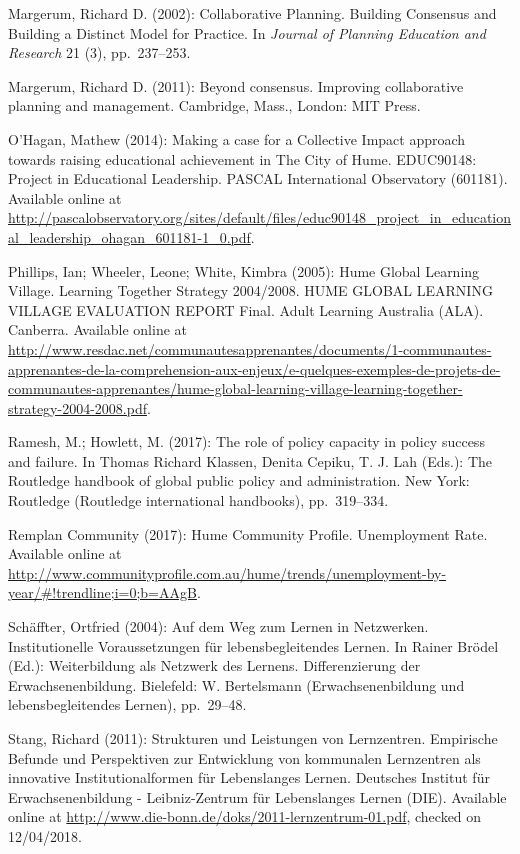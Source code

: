 \documentclass[a4paper,
fontsize=11pt,
oneside,
numbers=noperiodatend,
parskip=half-,
bibliography=totoc,
final
]{scrartcl}
\begin{document}
Margerum, Richard D. (2002): Collaborative Planning. Building Consensus
and Building a Distinct Model for Practice. In \emph{Journal of Planning
Education and Research} 21 (3), pp.~237--253.

Margerum, Richard D. (2011): Beyond consensus. Improving collaborative
planning and management. Cambridge, Mass., London: MIT Press.

O'Hagan, Mathew (2014): Making a case for a Collective Impact approach
towards raising educational achievement in The City of Hume. EDUC90148:
Project in Educational Leadership. PASCAL International Observatory
(601181). Available online at
\url{http://pascalobservatory.org/sites/default/files/educ90148_project_in_educational_leadership_ohagan_601181-1_0.pdf}.

Phillips, Ian; Wheeler, Leone; White, Kimbra (2005): Hume Global
Learning Village. Learning Together Strategy 2004/2008. HUME GLOBAL
LEARNING VILLAGE EVALUATION REPORT Final. Adult Learning Australia
(ALA). Canberra. Available online at
\url{http://www.resdac.net/communautesapprenantes/documents/1-communautes-apprenantes-de-la-comprehension-aux-enjeux/e-quelques-exemples-de-projets-de-communautes-apprenantes/hume-global-learning-village-learning-together-strategy-2004-2008.pdf}.

Ramesh, M.; Howlett, M. (2017): The role of policy capacity in policy
success and failure. In Thomas Richard Klassen, Denita Cepiku, T. J. Lah
(Eds.): The Routledge handbook of global public policy and
administration. New York: Routledge (Routledge international handbooks),
pp.~319--334.

Remplan Community (2017): Hume Community Profile. Unemployment Rate.
Available online at
\url{http://www.communityprofile.com.au/hume/trends/unemployment-by-year/\#!trendline;i=0;b=AAgB}.

Schäffter, Ortfried (2004): Auf dem Weg zum Lernen in Netzwerken.
Institutionelle Voraussetzungen für lebensbegleitendes Lernen. In Rainer
Brödel (Ed.): Weiterbildung als Netzwerk des Lernens. Differenzierung
der Erwachsenenbildung. Bielefeld: W. Bertelsmann (Erwachsenenbildung
und lebensbegleitendes Lernen), pp.~29--48.

Stang, Richard (2011): Strukturen und Leistungen von Lernzentren.
Empirische Befunde und Perspektiven zur Entwicklung von kommunalen
Lernzentren als innovative Institutionalformen für Lebenslanges Lernen.
Deutsches Institut für Erwachsenenbildung - Leibniz-Zentrum für
Lebenslanges Lernen (DIE). Available online at
\url{http://www.die-bonn.de/doks/2011-lernzentrum-01.pdf}, checked on
12/04/2018.
\end{document}
